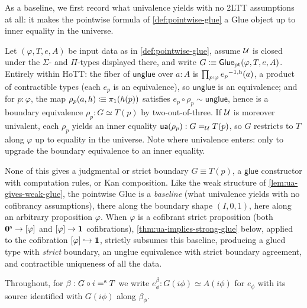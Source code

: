 \begin{longversion}
As a baseline, we first record what univalence yields with no 2LTT
assumptions at all: it makes the pointwise formula of
\cref{def:pointwise-glue} a Glue object up to inner equality in the universe.

\begin{remark}\label{rem:pointwise-glue-from-UA}
	Let \((\varphi,T,e,A)\) be input data as in \cref{def:pointwise-glue},
	assume \(\mathcal{U}\) is closed under the \(\Sigma\)- and \(\Pi\)-types
	displayed there, and write
	\(G \mathrel{\vcentcolon\mspace{-1mu}\equiv} \mathsf{Glue}_{\mathrm{pt}}(\varphi,T,e,A)\).
	Entirely within HoTT: the fiber of \(\mathsf{unglue}\) over \(a:A\) is
	\(\prod_{p:\varphi}{e_p}^{-1, \textup{h}}(a)\), a product of contractible types
	(each \(e_p\) is an equivalence), so \(\mathsf{unglue}\) is an equivalence;
	and for \(p:\varphi\), the map \(\rho_p(a,h)\mathrel{\vcentcolon\mspace{-1mu}\equiv}\pi_1(h(p))\)
	satisfies \(e_p\circ\rho_p\sim\mathsf{unglue}\), hence is a boundary
	equivalence \(\rho_p:G\simeq T(p)\) by two-out-of-three. If \(\mathcal{U}\) is
	moreover univalent, each \(\rho_p\) yields an inner equality
	\(\mathsf{ua}(\rho_p):G=_{\mathcal{U}} T(p)\), so \(G\) restricts to \(T\) along
	\(\varphi\) up to equality in the universe. Note where univalence enters:
	only to upgrade the boundary equivalence to an inner equality.

	None of this gives a judgmental or strict boundary \(G\equiv T(p)\), a
	\(\mathsf{glue}\) constructor with computation rules, or Kan composition.
	Like the weak structure of \cref{lem:ua-gives-weak-glue}, the pointwise
	Glue is a \emph{baseline} (what univalence yields with no cofibrancy
	assumptions), there along the boundary shape \((I,0,1)\), here along an
	arbitrary proposition \(\varphi\). When \(\varphi\) is a cofibrant strict
	proposition (both \(\mathbf{0}^\textup{s}\to[\varphi]\) and \([\varphi]\to\mathbf{1}\)
	cofibrations),
	\cref{thm:ua-implies-strong-glue} below, applied to the cofibration
	\([\varphi]\hookrightarrow\mathbf{1}\), strictly subsumes this baseline,
	producing a glued type with \emph{strict} boundary, an unglue
	equivalence with strict boundary agreement, and contractible uniqueness
	of all the data.
\end{remark}
\end{longversion}

Throughout, for $\beta:G\circ i\mathrel{=^\textup{s}} T$ we write
$e^\beta_\phi:G(i\phi)\simeq A(i\phi)$ for $e_\phi$ with its source identified
with $G(i\phi)$ along $\beta_\phi$.

